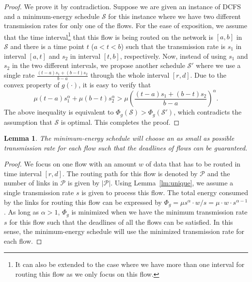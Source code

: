 \documentclass[10pt, conference, compsocconf]{IEEEtran}
\newtheorem{lemma}{Lemma}
\begin{document}
\begin{proof}
We prove it by contradiction. Suppose we are given an instance of DCFS and a minimum-energy schedule $\mathcal{S}$ for this instance where we have two different transmission rates for only one of the flows. For the ease of exposition, we assume that the time interval\footnote{It can also be extended to the case where we have more than one interval for routing this flow as we only focus on this flow.} that this flow is being routed on the network is $[a,b]$ in $\mathcal{S}$ and there is a time point $t$ ($a < t < b$) such that the transmission rate is $s_1$ in interval $[a,t]$ and $s_2$ in interval $[t,b]$, respectively. Now, instead of using $s_1$ and $s_2$ in the two different intervals, we propose another schedule $\mathcal{S}'$ where we use a single rate $\frac{(t-a)s_1 + (b-t)s_2}{b-a}$ through the whole interval $[r,d]$. Due to the convex property of $g(\cdot)$, it is easy to verify that
\begin{equation}
\mu (t-a)s_1^{\alpha} + \mu(b-t)s_2^{\alpha} > \mu\left(\frac{(t-a)s_1 + (b-t)s_2}{b-a}\right)^{\alpha}. \nonumber
\end{equation}
The above inequality is equivalent to $\Phi_g(\mathcal{S}) > \Phi_g(\mathcal{S}')$, which contradicts the assumption that $\mathcal{S}$ is optimal. This completes the proof.
\end{proof}

\begin{lemma}
\label{lm:minimum}
The minimum-energy schedule will choose an as small as possible transmission rate for each flow such that the deadlines of flows can be guaranteed.
\end{lemma}
\begin{proof}
We focus on one flow with an amount $w$ of data that has to be routed in time interval $[r,d]$. The routing path for this flow is denoted by $\mathcal{P}$ and the number of links in $\mathcal{P}$ is given by $|\mathcal{P}|$. Using Lemma~\ref{lm:unique}, we assume a single transmission rate $s$ is given to process this flow. The total energy consumed by the links for routing this flow can be expressed by $\Phi_g = \mu s^{\alpha} \cdot w/s = \mu \cdot w \cdot s^{\alpha - 1}$. As long as $\alpha > 1$, $\Phi_g$ is minimized when we have the minimum transmission rate $s$ for this flow such that the deadlines of all the flows can be satisfied. In this sense, the minimum-energy schedule will use the minimized transmission rate for each flow.
\end{proof}
\end{document}
